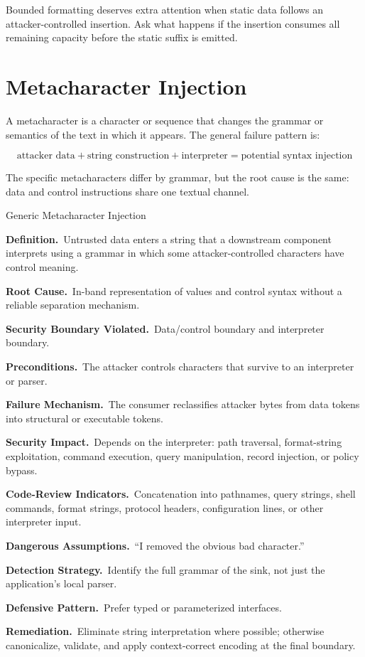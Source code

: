 \documentclass[11pt]{article}
\newcommand{\field}[1]{\par\smallskip\noindent\textbf{#1.}\ }
\begin{document}
\begin{auditheuristic}
Bounded formatting deserves extra attention when static data follows an attacker-controlled insertion. Ask what happens if the insertion consumes all remaining capacity before the static suffix is emitted.
\end{auditheuristic}
\clearpage

\section{Metacharacter Injection}

A metacharacter is a character or sequence that changes the grammar or semantics of the text in which it appears. The general failure pattern is:

\[
\boxed{\text{attacker data}}
+
\boxed{\text{string construction}}
+
\boxed{\text{interpreter}}
=
\boxed{\text{potential syntax injection}}
\]

The specific metacharacters differ by grammar, but the root cause is the same: data and control instructions share one textual channel.

\begin{catalogbox}{Generic Metacharacter Injection}
\field{Definition}Untrusted data enters a string that a downstream component interprets using a grammar in which some attacker-controlled characters have control meaning.

\field{Root Cause}In-band representation of values and control syntax without a reliable separation mechanism.

\field{Security Boundary Violated}Data/control boundary and interpreter boundary.

\field{Preconditions}The attacker controls characters that survive to an interpreter or parser.

\field{Failure Mechanism}The consumer reclassifies attacker bytes from data tokens into structural or executable tokens.

\field{Security Impact}Depends on the interpreter: path traversal, format-string exploitation, command execution, query manipulation, record injection, or policy bypass.

\field{Code-Review Indicators}Concatenation into pathnames, query strings, shell commands, format strings, protocol headers, configuration lines, or other interpreter input.

\field{Dangerous Assumptions}``I removed the obvious bad character.''

\field{Detection Strategy}Identify the full grammar of the sink, not just the application's local parser.

\field{Defensive Pattern}Prefer typed or parameterized interfaces.

\field{Remediation}Eliminate string interpretation where possible; otherwise canonicalize, validate, and apply context-correct encoding at the final boundary.
\end{catalogbox}
\clearpage
\end{document}
